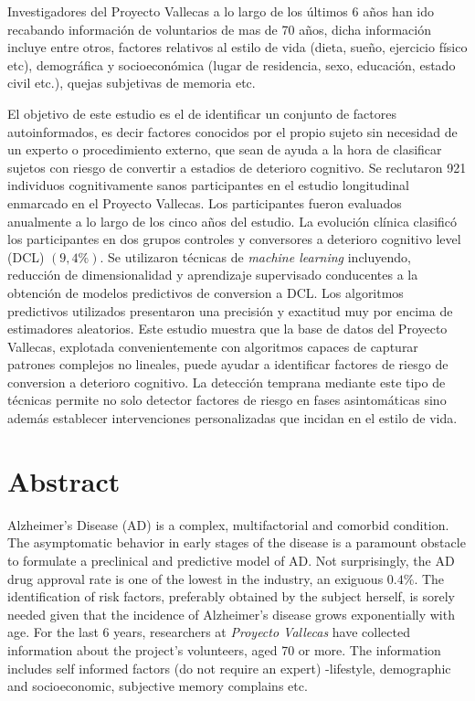 \documentclass[11pt]{article}
\theoremstyle{definition}
\theoremstyle{remark}
\begin{document}
Investigadores del Proyecto Vallecas a lo largo de los últimos 6 años han ido recabando información de voluntarios de mas de 70 años, dicha información incluye entre otros, factores relativos al estilo de vida (dieta, sueño, ejercicio físico etc), demográfica y socioeconómica (lugar de residencia, sexo, educación, estado civil etc.), quejas subjetivas de memoria etc.

El objetivo de este estudio es el de identificar un conjunto de factores autoinformados, es decir factores conocidos por el propio sujeto sin necesidad de un experto o procedimiento externo, que sean de ayuda a la hora de clasificar sujetos con riesgo de convertir a estadios de deterioro cognitivo. 
Se reclutaron 921 individuos cognitivamente sanos participantes en el estudio longitudinal enmarcado en el Proyecto Vallecas. Los participantes fueron evaluados anualmente a lo largo de los cinco años del estudio. La evolución clínica clasificó los participantes en dos grupos controles y conversores a deterioro cognitivo level (DCL) $(9,4\%)$. 
Se utilizaron técnicas de \emph{machine learning} incluyendo, reducción de dimensionalidad y aprendizaje supervisado conducentes a la obtención de modelos predictivos de conversion a DCL. Los algoritmos predictivos utilizados presentaron una precisión y exactitud muy por encima de estimadores aleatorios.
Este estudio muestra que la base de datos del Proyecto Vallecas, explotada convenientemente con algoritmos capaces de capturar patrones complejos no lineales, puede ayudar a identificar factores de riesgo de conversion a deterioro cognitivo. La detección temprana mediante este tipo de técnicas permite no solo detector factores de riesgo en fases asintomáticas sino además establecer intervenciones personalizadas que incidan en el estilo de vida.

\section*{Abstract}
Alzheimer's Disease (AD) is a complex, multifactorial and comorbid condition. The asymptomatic behavior in early stages of the disease is a paramount obstacle to formulate a preclinical and predictive model of AD. Not surprisingly, the AD drug approval rate is one of the lowest in the industry, an exiguous $0.4\%$. The identification of risk factors, preferably obtained by the subject herself, is sorely needed given that the incidence of Alzheimer’s disease grows exponentially with age. 
For the last 6 years, researchers at \emph{Proyecto Vallecas} have collected information about the project's volunteers, aged 70 or more. The  information includes self informed factors (do not require an expert) -lifestyle, demographic and socioeconomic, subjective memory complains etc. 
\end{document}
